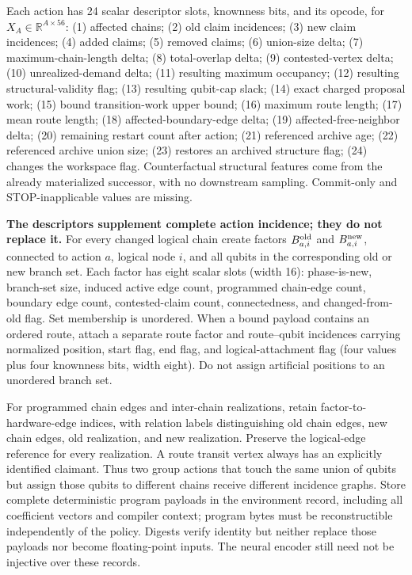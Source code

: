 Each action has 24 scalar descriptor slots, knownness bits, and its opcode, for \(X_A\in\mathbb R^{A\times56}\): (1) affected chains; (2) old claim incidences; (3) new claim incidences; (4) added claims; (5) removed claims; (6) union-size delta; (7) maximum-chain-length delta; (8) total-overlap delta; (9) contested-vertex delta; (10) unrealized-demand delta; (11) resulting maximum occupancy; (12) resulting structural-validity flag; (13) resulting qubit-cap slack; (14) exact charged proposal work; (15) bound transition-work upper bound; (16) maximum route length; (17) mean route length; (18) affected-boundary-edge delta; (19) affected-free-neighbor delta; (20) remaining restart count after action; (21) referenced archive age; (22) referenced archive union size; (23) restores an archived structure flag; (24) changes the workspace flag. Counterfactual structural features come from the already materialized successor, with no downstream sampling. Commit-only and STOP-inapplicable values are missing.

\textbf{The descriptors supplement complete action incidence; they do not replace it.} For every changed logical chain create factors \(B_{a,i}^{\rm old}\) and \(B_{a,i}^{\rm new}\), connected to action \(a\), logical node \(i\), and all qubits in the corresponding old or new branch set. Each factor has eight scalar slots (width 16): phase-is-new, branch-set size, induced active edge count, programmed chain-edge count, boundary edge count, contested-claim count, connectedness, and changed-from-old flag. Set membership is unordered. When a bound payload contains an ordered route, attach a separate route factor and route--qubit incidences carrying normalized position, start flag, end flag, and logical-attachment flag (four values plus four knownness bits, width eight). Do not assign artificial positions to an unordered branch set.

For programmed chain edges and inter-chain realizations, retain factor-to-hardware-edge indices, with relation labels distinguishing old chain edges, new chain edges, old realization, and new realization. Preserve the logical-edge reference for every realization. A route transit vertex always has an explicitly identified claimant. Thus two group actions that touch the same union of qubits but assign those qubits to different chains receive different incidence graphs. Store complete deterministic program payloads in the environment record, including all coefficient vectors and compiler context; program bytes must be reconstructible independently of the policy. Digests verify identity but neither replace those payloads nor become floating-point inputs. The neural encoder still need not be injective over these records.

